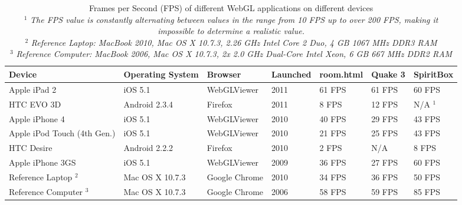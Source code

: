 \documentclass[12pt,journal,compsoc]{IEEEtran}
\begin{document}
\begin{table*}[tb]
	\begin{centering}
	\begin{tabular}{l|l|l|l|l|l|l}
		\textbf{Device}	& \textbf{Operating System}	& \textbf{Browser}	& \textbf{Launched}	& \textbf{room.html}	& \textbf{Quake 3}	&	\textbf{SpiritBox}	\\
		\hline
		Apple iPad 2				& iOS 5.1			& WebGLViewer	& 2011		& 61 FPS	& 61 FPS	& 60 FPS		\\ 
		HTC EVO 3D					& Android 2.3.4		& Firefox		& 2011		& 8 FPS		& 12 FPS	& N/A $^{1}$	\\ 
		Apple iPhone 4				& iOS 5.1			& WebGLViewer	& 2010		& 40 FPS	& 29 FPS	& 43 FPS		\\
		Apple iPod Touch (4th Gen.)	& iOS 5.1			& WebGLViewer	& 2010		& 21 FPS	& 25 FPS	& 43 FPS		\\ 
		HTC Desire					& Android 2.2.2		& Firefox		& 2010		& 2 FPS 	& N/A		& 8 FPS			\\ %
		Apple iPhone 3GS			& iOS 5.1			& WebGLViewer	& 2009		&	36 FPS		&	27 FPS	&	60 FPS			\\
		\hline
		Reference Laptop $^{2}$			& 	Mac OS X 10.7.3			& 	Google Chrome	&	2010	&	34 FPS	&	36 FPS	&		50 FPS	\\
		Reference Computer $^{3}$		& 	Mac OS X 10.7.3			& 	Google Chrome	&	2006	&	58 FPS	&	59 FPS	&		85 FPS	\\
	\end{tabular}
	\caption{Frames per Second (FPS) of different WebGL applications on different devices\label{fpsTable}
	\\$^{1}$ \textit{The FPS value is constantly alternating between values in the range from 10 FPS up to over 200 FPS, making it impossible to determine a realistic value.}
	\\$^{2}$ \textit{Reference Laptop: MacBook 2010, Mac OS X 10.7.3, 2.26 GHz Intel Core 2 Duo, 4 GB 1067 MHz DDR3 RAM}
	\\$^{3}$ \textit{Reference Computer: MacBook 2006, Mac OS X 10.7.3, 2x 2.0 GHz Dual-Core Intel Xeon, 6 GB 667 MHz DDR2 RAM}}
	\end{centering}
\end{table*}
\end{document}
